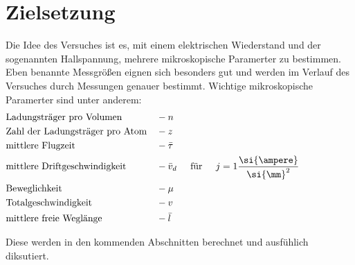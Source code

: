 \section{Zielsetzung}
\label{sec:zielsetzung}
Die Idee des Versuches ist es, mit einem elektrischen Wiederstand und der sogenannten Hallspannung, mehrere mikroskopische Paramerter zu bestimmen. 
Eben benannte Messgrößen eignen sich besonders gut und werden im Verlauf des Versuches durch Messungen genauer bestimmt. Wichtige mikroskopische Paramerter sind unter anderem:
\begin{align*}
\label{al:Sammlung}
&\text{Ladungsträger pro Volumen } &&- n \\
&\text{Zahl der Ladungsträger pro Atom} &&- z \\
&\text{mittlere Flugzeit} &&- \bar{\tau} \\
&\text{mittlere Driftgeschwindigkeit} &&- \bar{v}_d \hspace{0.5cm}\text{für} \hspace{0.5cm} j = 1 \frac{\si{\ampere}}{{\si{\mm}}^2} \hspace{2cm}\\
&\text{Beweglichkeit} &&-\mu \\
&\text{Totalgeschwindigkeit} &&- v \\
&\text{mittlere freie Weglänge} &&- \bar{l}
\end{align*} 

\flushleft
Diese werden in den kommenden Abschnitten berechnet und ausfühlich diksutiert.
